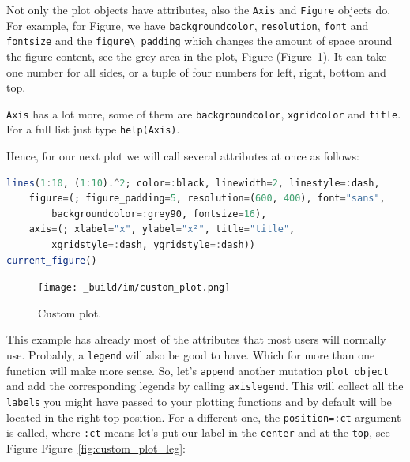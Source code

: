 \documentclass[
  notoc %
]{tufte-book}
\newcommand{\passthrough}[1]{#1}
\begin{document}
Not only the plot objects have attributes, also the
\passthrough{\lstinline!Axis!} and \passthrough{\lstinline!Figure!}
objects do. For example, for Figure, we have
\passthrough{\lstinline!backgroundcolor!},
\passthrough{\lstinline!resolution!}, \passthrough{\lstinline!font!} and
\passthrough{\lstinline!fontsize!} and the
\passthrough{\lstinline!figure\_padding!} which changes the amount of
space around the figure content, see the grey area in the plot, Figure
(Figure~\ref{fig:custom_plot}). It can take one number for all sides, or
a tuple of four numbers for left, right, bottom and top.

\passthrough{\lstinline!Axis!} has a lot more, some of them are
\passthrough{\lstinline!backgroundcolor!},
\passthrough{\lstinline!xgridcolor!} and
\passthrough{\lstinline!title!}. For a full list just type
\passthrough{\lstinline!help(Axis)!}.

Hence, for our next plot we will call several attributes at once as
follows:

\begin{lstlisting}[language=Julia]
lines(1:10, (1:10).^2; color=:black, linewidth=2, linestyle=:dash,
    figure=(; figure_padding=5, resolution=(600, 400), font="sans",
        backgroundcolor=:grey90, fontsize=16),
    axis=(; xlabel="x", ylabel="x²", title="title",
        xgridstyle=:dash, ygridstyle=:dash))
current_figure()
\end{lstlisting}

\begin{figure}
\hypertarget{fig:custom_plot}{%
\centering
\texttt{[image: \_build/im/custom\_plot.png]}
\caption{Custom plot.}\label{fig:custom_plot}
}
\end{figure}

This example has already most of the attributes that most users will
normally use. Probably, a \passthrough{\lstinline!legend!} will also be
good to have. Which for more than one function will make more sense. So,
let's \passthrough{\lstinline!append!} another mutation
\passthrough{\lstinline!plot object!} and add the corresponding legends
by calling \passthrough{\lstinline!axislegend!}. This will collect all
the \passthrough{\lstinline!labels!} you might have passed to your
plotting functions and by default will be located in the right top
position. For a different one, the
\passthrough{\lstinline!position=:ct!} argument is called, where
\passthrough{\lstinline!:ct!} means let's put our label in the
\passthrough{\lstinline!center!} and at the
\passthrough{\lstinline!top!}, see Figure
Figure~\ref{fig:custom_plot_leg}:
\end{document}
